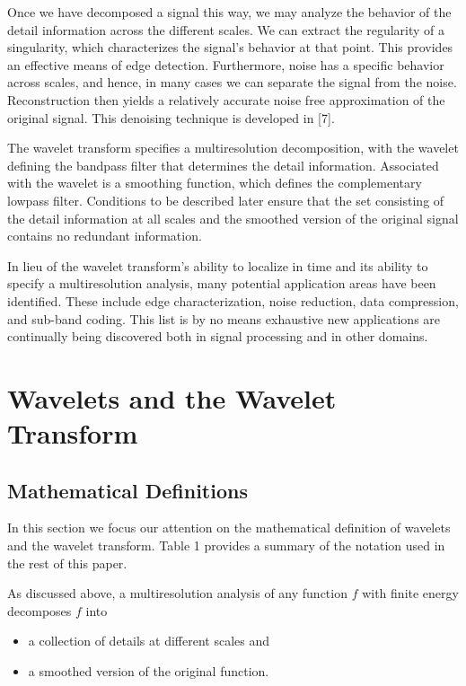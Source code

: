 \documentclass[a4paper,12pt]{article}
\begin{document}
Once we have decomposed a signal this way, we may analyze the behavior of the detail information across the different scales. We can extract the regularity of a singularity, which characterizes the signal's behavior at that point. This provides an effective means of edge detection. Furthermore, noise has a specific behavior across scales, and hence, in many cases we can separate the signal from the noise. Reconstruction then yields a relatively accurate noise free approximation of the original signal. This denoising technique is developed in [7].

The wavelet transform specifies a multiresolution decomposition, with the wavelet defining the bandpass filter that determines the detail information. Associated with the wavelet is a smoothing function, which defines the complementary lowpass filter. Conditions to be described later ensure that the set consisting of the detail information at all scales and the smoothed version of the original signal contains no redundant information.

In lieu of the wavelet transform's ability to localize in time and its ability to specify a multiresolution analysis, many potential application areas have been identified. These include edge characterization, noise reduction, data compression, and sub-band coding. This list is by no means exhaustive {\textendash} new applications are continually being discovered both in signal processing and in other domains.

\section{Wavelets and the Wavelet Transform}

\subsection{Mathematical Definitions}

In this section we focus our attention on the mathematical definition of wavelets and the wavelet transform.
Table 1 provides a summary of the notation used in the rest of this paper.

As discussed above, a multiresolution analysis of any function \(f\) with finite energy decomposes \(f\) into

\begin{itemize}
\item a collection of details at different scales and
\item a smoothed version of the original function.
\end{itemize}
\end{document}
